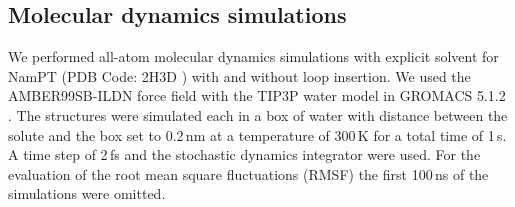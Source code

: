 \subsection{Molecular dynamics simulations}
We performed all-atom molecular dynamics simulations with explicit solvent for NamPT (PDB Code: 2H3D \cite{Wang2006}) with and without loop insertion. We used the AMBER99SB-ILDN force field \cite{Lindorff-Larsen2010} with the TIP3P water model \cite{Jorgensen1983} in GROMACS 5.1.2 \cite{Abraham2015}. The structures were simulated each in a box of water with distance between the solute and the box set to 0.2\,nm at a temperature of 300\,K for a total time of 1\,\textmu s. A time step of 2\,fs and the stochastic dynamics integrator were used. For the evaluation of the root mean square fluctuations (RMSF) the first 100\,ns of the simulations were omitted.
